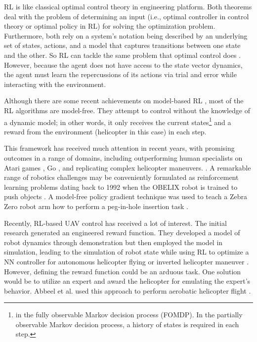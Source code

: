 RL is like classical optimal control theory \cite{sutton2018reinforcement} in engineering platform. Both theorems deal with the problem of determining an input (i.e., optimal controller in control theory or optimal policy in RL) for solving the optimization problem. Furthermore, both rely on a system's notation being described by an underlying set of states, actions, and a model that captures transitions between one state and the other. So RL can tackle the same problem that optimal control does \cite{nian2020review, powell2012ai}. However, because the agent does not have access to the state vector dynamics, the agent must learn the repercussions of its actions via trial and error while interacting with the environment. 

Although there are some recent achievements on model-based RL \cite{kaiser2019model}, most of the RL algorithms are model-free. They attempt to control without the knowledge of a dynamic model; in other words, it only receives the current states\footnote{in the fully observable Markov decision process (FOMDP). In the partially observable Markov decision process, a history of states is required in each step.} and a reward from the environment (helicopter in this case) in each step.  

This framework has received much attention in recent years, with promising outcomes in a range of domains, including outperforming human specialists on Atari games \cite{mnih2013playing}, Go \cite{silver2017mastering}, and replicating complex helicopter maneuvers. \cite{abbeel2007application, ng2006autonomous,ng2003autonomous} . A remarkable range of robotics challenges may be conveniently formulated as reinforcement learning problems dating back to 1992 when the OBELIX robot is trained to push objects \cite{mahadevan1992automatic}. A model-free policy gradient technique was used to teach a Zebra Zero robot arm how to perform a peg-in-hole insertion task \cite{gullapalli1994acquiring}. 

Recently, RL-based UAV control has received a lot of interest. The initial research generated an engineered reward function. They developed a model of robot dynamics through demonstration but then employed the model in simulation, leading to the simulation of robot state while using RL to optimize a NN controller for autonomous helicopter flying \cite{bagnell2001autonomous} or inverted helicopter maneuver \cite{ng2006autonomous}. However, defining the reward function could be an arduous task. One solution would be to utilize an expert and award the helicopter for emulating the expert's behavior. Abbeel et al. used this approach to perform aerobatic helicopter flight \cite{abbeel2007application}. 

